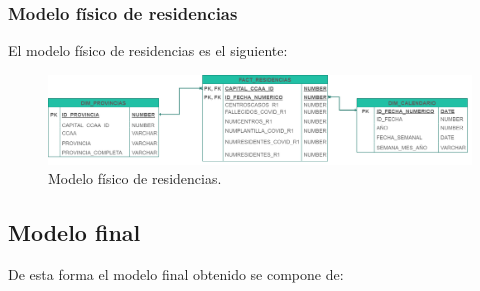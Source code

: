 \subsubsection{Modelo físico de residencias}
El modelo físico de residencias es el siguiente:

\begin{figure}[h]
    \advance\leftskip-0.5cm 
    \includegraphics[scale=0.5]{img/residencias_fisico.png}
    \caption{Modelo físico de residencias.}
\end{figure}
\newpage

\subsection{Modelo final}
De esta forma el modelo final obtenido se compone de:


